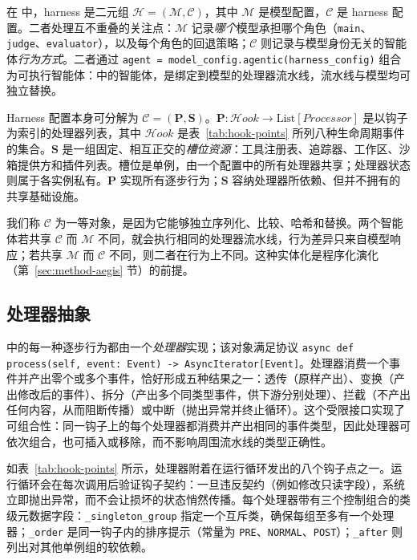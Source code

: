 在 \ProjectName 中，harness 是二元组 $\mathcal{H}=(\mathcal{M},\mathcal{C})$，其中 $\mathcal{M}$ 是模型配置，$\mathcal{C}$ 是 harness 配置。二者处理互不重叠的关注点：$\mathcal{M}$ 记录\textit{哪个}模型承担哪个角色（\texttt{main}、\texttt{judge}、\texttt{evaluator}），以及每个角色的回退策略；$\mathcal{C}$ 则记录与模型身份无关的智能体\textit{行为方式}。二者通过 \texttt{agent = model\_config.agentic(harness\_config)} 组合为可执行智能体：\ProjectName 中的智能体，是绑定到模型的处理器流水线，流水线与模型均可独立替换。

Harness 配置本身可分解为 $\mathcal{C}=(\mathbf{P},\mathbf{S})$。$\mathbf{P}:\mathcal{H}\!\mathit{ook}\to\mathrm{List}[\mathit{Processor}]$ 是以钩子为索引的处理器列表，其中 $\mathcal{H}\!\mathit{ook}$ 是表~\ref{tab:hook-points} 所列八种生命周期事件的集合。$\mathbf{S}$ 是一组固定、相互正交的\textit{槽位资源}：工具注册表、追踪器、工作区、沙箱提供方和插件列表。槽位是单例，由一个配置中的所有处理器共享；处理器状态则属于各实例私有。$\mathbf{P}$ 实现所有逐步行为；$\mathbf{S}$ 容纳处理器所依赖、但并不拥有的共享基础设施。

我们称 $\mathcal{C}$ 为一等对象，是因为它能够独立序列化、比较、哈希和替换。两个智能体若共享 $\mathcal{C}$ 而 $\mathcal{M}$ 不同，就会执行相同的处理器流水线，行为差异只来自模型响应；若共享 $\mathcal{M}$ 而 $\mathcal{C}$ 不同，则二者在行为上不同。这种实体化是程序化演化（第~\ref{sec:method-aegis} 节）的前提。

\subsection{处理器抽象}
\label{sec:foundry-processor}

\ProjectName 中的每一种逐步行为都由一个\textit{处理器}实现；该对象满足协议 \texttt{async def process(self, event: Event) -> AsyncIterator[Event]}。处理器消费一个事件并产出零个或多个事件，恰好形成五种结果之一：透传（原样产出）、变换（产出修改后的事件）、拆分（产出多个同类型事件，供下游分别处理）、拦截（不产出任何内容，从而阻断传播）或中断（抛出异常并终止循环）。这个受限接口实现了可组合性：同一钩子上的每个处理器都消费并产出相同的事件类型，因此处理器可依次组合，也可插入或移除，而不影响周围流水线的类型正确性。

如表~\ref{tab:hook-points} 所示，处理器附着在运行循环发出的八个钩子点之一。运行循环会在每次调用后验证钩子契约：一旦违反契约（例如修改只读字段），系统立即抛出异常，而不会让损坏的状态悄然传播。每个处理器带有三个控制组合的类级元数据字段：\texttt{\_singleton\_group} 指定一个互斥类，确保每组至多有一个处理器；\texttt{\_order} 是同一钩子内的排序提示（常量为 \texttt{PRE}、\texttt{NORMAL}、\texttt{POST}）；\texttt{\_after} 则列出对其他单例组的软依赖。

